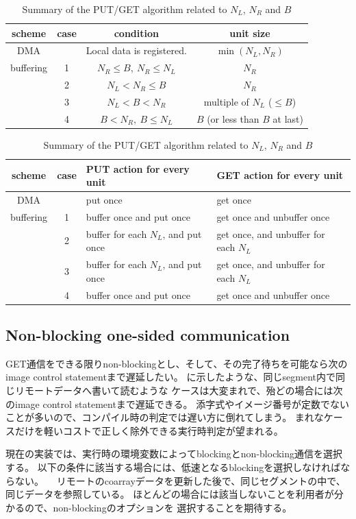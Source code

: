 \begin{table}[tbh]
 \caption{Summary of the PUT/GET algorithm related to $N_L$, $N_R$ and $B$}
 \label{tab:putget}
 \begin{flushleft}
  \begin{tabular}{|@{~}c@{~}|c||@{~}c@{~}|@{~}c@{~}|}
\hline
scheme &
case &
condition &
unit size \\
\hline
\hline
DMA &
&
Local data is registered. &
$\min(N_L, N_R)$ \\
\hline
buffering &
1 & 
$N_R \leq B,~ N_R \leq N_L$ &
$N_R$ \\
\cline{2-4}
&
2 &
$N_L < N_R \leq B$ &
$N_R$ \\
\cline{2-4}
&
3 &
$N_L < B < N_R$ &
multiple of $N_L$ ($\leq B$) \\
\cline{2-4}
&
4 &
$B < N_R,~ B \leq N_L$ &
$B$ (or less than $B$ at last) \\
\hline
  \end{tabular}
 \end{flushleft}
 \begin{flushleft}
  \begin{tabular}{|@{~}c@{~}|c||@{~~}l@{~~}|@{~~}l@{~~}|}
\hline
scheme &
case &
PUT action for every unit &
GET action for every unit \\
\hline
\hline
DMA &
&
put once &
get once \\
\hline
buffering &
1 &
buffer once and put once &
get once and unbuffer once \\
\cline{2-4}
&
2 &
buffer for each $N_L$, and put once &
get once, and unbuffer for each $N_L$ \\
\cline{2-4}
&
3 &
buffer for each $N_L$, and put once &
get once, and unbuffer for each $N_L$ \\
\cline{2-4}
&
4 &
buffer once and put once &
get once and unbuffer once \\
\hline
  \end{tabular}
 \end{flushleft}
\end{table}



\subsection{Non-blocking one-sided communication}

GET通信をできる限りnon-blockingとし、そして、その完了待ちを可能なら次のimage control statementまで遅延したい。
に示したような、同じsegment内で同じリモートデータへ書いて読むような
ケースは大変まれで、殆どの場合には次のimage control statementまで遅延できる。
添字式やイメージ番号が定数でないことが多いので、コンパイル時の判定では遅い方に倒れてしまう。
まれなケースだけを軽いコストで正しく除外できる実行時判定が望まれる。

現在の実装では、実行時の環境変数によってblockingとnon-blocking通信を選択する。
以下の条件に該当する場合には、低速となるblockingを選択しなければならない。
　リモートのcoarrayデータを更新した後で、同じセグメントの中で、同じデータを参照している。
ほとんどの場合には該当しないことを利用者が分かるので、non-blockingのオプションを
選択することを期待する。





